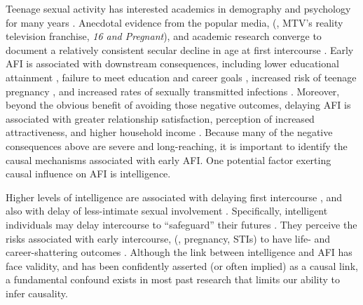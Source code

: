 Teenage sexual activity has interested academics in demography and psychology for many years \citep{Brooks-Gunn1989,kinsey1948sexual,santelli2000adolescent}. Anecdotal evidence from the popular media, (\eg, MTV's reality television franchise, \textit{16 and Pregnant}\nocite{mtv}), 
and academic research converge to document a relatively consistent secular decline in age at first intercourse  \citep[AFI; see][]{bozon2003,finer2007trends,Kann2014}. Early AFI is associated with downstream consequences, including lower educational attainment \citep{Harden2012,Spriggs2008,Wellings2001}, failure to meet education and career goals \citep{halpern2000smart}, increased risk of teenage pregnancy \citep{Leitenberg2000,Wellings2001}, and increased rates of sexually transmitted infections \citep[STIs;][]{kaestle2005young}. Moreover, beyond the obvious benefit of avoiding those negative outcomes, delaying AFI is associated with greater relationship satisfaction, perception of increased attractiveness, and higher household income \citep{Harden2012}. Because many of the negative consequences above are severe and long-reaching, it is important to identify the causal mechanisms associated with early AFI. One potential factor exerting causal influence on AFI is intelligence.

Higher levels of intelligence are associated with delaying first intercourse \citep{halpern2000smart,mott1983early,Paul2000,Woodward2001}, and also with delay of less-intimate sexual involvement \citep{halpern2000smart}. Specifically, intelligent individuals may delay intercourse to ``safeguard'' their futures \citep{kirby2002effective, manlove1998influence, raffaelli2003sexual}. They perceive the risks associated with early intercourse, (\eg, pregnancy, STIs) to have life- and career-shattering outcomes \citep{halpern2000smart,harden2011don}. Although the link between intelligence and AFI has face validity, and has been confidently asserted (or often implied) as a causal link, a fundamental confound exists in most past research that limits our ability to infer causality.

